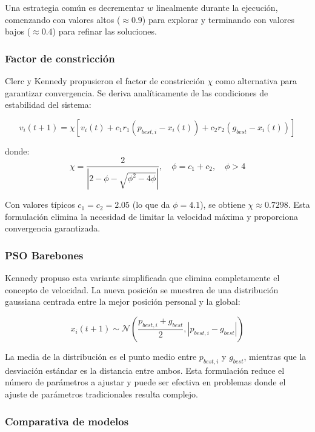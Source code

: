 \documentclass[12pt]{article}
\begin{document}
Una estrategia común es decrementar $w$ linealmente durante la
ejecución, comenzando con valores altos ($\approx 0.9$) para
explorar y terminando con valores bajos ($\approx 0.4$) para
refinar las soluciones.

\subsubsection{Factor de constricción}

Clerc y Kennedy propusieron el factor de constricción $\chi$ como
alternativa para garantizar convergencia. Se deriva analíticamente
de las condiciones de estabilidad del sistema:

\begin{equation}
  v_i(t+1) = \chi \left[ v_i(t) + c_1 r_1 (p_{best,i} - x_i(t)) + c_2
  r_2 (g_{best} - x_i(t)) \right]
\end{equation}

donde:
\begin{equation}
  \chi = \frac{2}{\left| 2 - \phi - \sqrt{\phi^2 - 4\phi} \right|},
  \quad \phi = c_1 + c_2, \quad \phi > 4
\end{equation}

Con valores típicos $c_1 = c_2 = 2.05$ (lo que da $\phi = 4.1$), se
obtiene $\chi \approx 0.7298$. Esta formulación elimina la necesidad
de limitar la velocidad máxima y proporciona convergencia garantizada.

\subsubsection{PSO Barebones}

Kennedy propuso esta variante simplificada que elimina completamente
el concepto de velocidad. La nueva posición se muestrea de una
distribución gaussiana centrada entre la mejor posición personal y
la global:

\begin{equation}
  x_i(t+1) \sim \mathcal{N} \left( \frac{p_{best,i} + g_{best}}{2},
  \left|p_{best,i} - g_{best}\right| \right)
\end{equation}

La media de la distribución es el punto medio entre $p_{best,i}$ y
$g_{best}$, mientras que la desviación estándar es la distancia
entre ambos. Esta formulación reduce el número de parámetros a
ajustar y puede ser efectiva en problemas donde el ajuste de
parámetros tradicionales resulta complejo.

\subsubsection{Comparativa de modelos}
\end{document}
